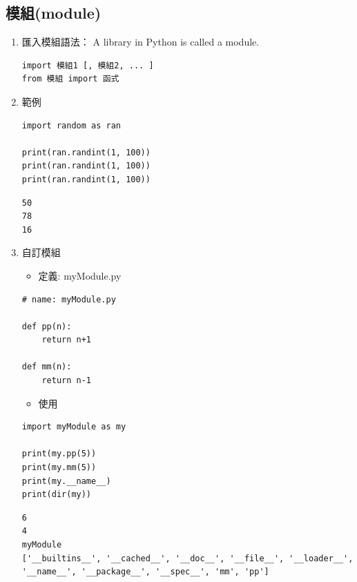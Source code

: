 \documentclass[a4paper,12pt]{article}
\begin{document}
\subsection{模組(module)}
\label{sec:org74c8070}
\begin{enumerate}
\item 匯入模組語法：
\label{sec:org10cd4ea}
A library in Python is called a module.\\
\lstset{breaklines=true,language=Python,label= ,caption= ,captionpos=b,firstnumber=1,numbers=left}
\begin{lstlisting}
import 模組1 [, 模組2, ... ]
from 模組 import 函式
\end{lstlisting}
\item 範例
\label{sec:org06e5531}
\lstset{breaklines=true,language=Python,label= ,caption= ,captionpos=b,firstnumber=1,numbers=left}
\begin{lstlisting}
import random as ran

print(ran.randint(1, 100))
print(ran.randint(1, 100))
print(ran.randint(1, 100))
\end{lstlisting}

\begin{verbatim}
50
78
16
\end{verbatim}
\item 自訂模組
\label{sec:orgb29fcfb}
\begin{itemize}
\item 定義: myModule.py\\
\end{itemize}
\lstset{breaklines=true,language=Python,label= ,caption= ,captionpos=b,firstnumber=1,numbers=left}
\begin{lstlisting}
# name: myModule.py

def pp(n):
    return n+1

def mm(n):
    return n-1
\end{lstlisting}
\begin{itemize}
\item 使用\\
\end{itemize}
\lstset{breaklines=true,language=Python,label= ,caption= ,captionpos=b,firstnumber=1,numbers=left}
\begin{lstlisting}
import myModule as my

print(my.pp(5))
print(my.mm(5))
print(my.__name__)
print(dir(my))
\end{lstlisting}

\begin{verbatim}
6
4
myModule
['__builtins__', '__cached__', '__doc__', '__file__', '__loader__', '__name__', '__package__', '__spec__', 'mm', 'pp']
\end{verbatim}
\end{enumerate}
\end{document}
